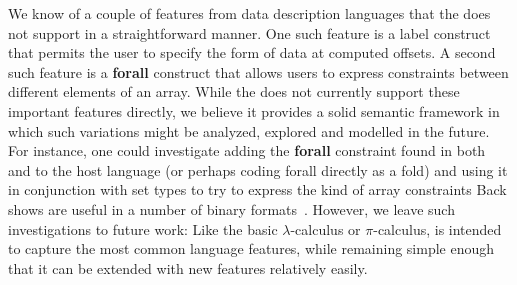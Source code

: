 We know of a couple of features from data description languages that
the \ddc{} does not support in a straightforward manner.  One such feature is 
a label construct that permits the user to specify the form of data
at computed offsets.  A second
such feature is a {\bf forall} construct that
allows users to express constraints between different
elements of an array.  
While the \ddc{} does not currently support these important
features directly, we believe it provides a solid semantic framework
in which such variations might be analyzed, explored and 
modelled in the future.  
For instance, one could investigate adding the  {\bf forall}
constraint found in both \datascript{} and \padsc{}
to the \ddc{} host language (or perhaps coding forall directly as a fold)
and using it in conjunction with \ddc{} set types
to try to express the kind of array constraints Back shows are useful
in a number of binary formats~\cite{gpce02}.  However, we leave such
investigations to future work:  Like the basic $\lambda$-calculus
or $\pi$-calculus, \ddc{} is intended to capture the most common language
features, while remaining simple enough that it can be extended
with new features relatively easily.




